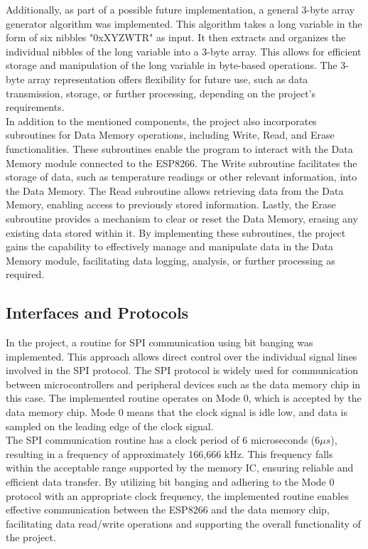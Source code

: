 Additionally, as part of a possible future implementation, a general 3-byte array generator algorithm was implemented. This 
algorithm takes a long variable in the form of six nibbles "0xXYZWTR" as input. It then extracts and organizes the individual 
nibbles of the long variable into a 3-byte array. This allows for efficient storage and manipulation of the long variable in 
byte-based operations. The 3-byte array representation offers flexibility for future use, such as data transmission, storage, 
or further processing, depending on the project's requirements. \\ 

In addition to the mentioned components, the project also incorporates subroutines for Data Memory operations, 
including Write, Read, and Erase functionalities. These subroutines enable the program to interact with the Data Memory 
module connected to the ESP8266. The Write subroutine facilitates the storage of data, such as temperature readings or other 
relevant information, into the Data Memory. The Read subroutine allows retrieving data from the Data Memory, enabling access 
to previously stored information. Lastly, the Erase subroutine provides a mechanism to clear or reset the Data Memory, erasing 
any existing data stored within it. By implementing these subroutines, the project gains the capability to effectively manage 
and manipulate data in the Data Memory module, facilitating data logging, analysis, or further processing as required.




\subsection{Interfaces and Protocols}\label{04Sub: InterfacesAndProtocols}

In the project, a routine for SPI communication using bit banging was implemented. This approach allows direct control over 
the individual signal lines involved in the SPI protocol. The SPI protocol is widely used for communication between 
microcontrollers and peripheral devices such as the data memory chip in this case. The implemented routine operates on Mode 0, 
which is accepted by the data memory chip. Mode 0 means that the clock signal is idle low, and data is sampled on the leading 
edge of the clock signal. \\ 

The SPI communication routine has a clock period of 6 microseconds (6$\mu s$), resulting in a frequency of approximately 
166,666 kHz. This frequency falls within the acceptable range supported by the memory IC, ensuring reliable and efficient data 
transfer. By utilizing bit banging and adhering to the Mode 0 protocol with an appropriate clock frequency, the implemented 
routine enables effective communication between the ESP8266 and the data memory chip, facilitating data read/write operations 
and supporting the overall functionality of the project. \\ 












